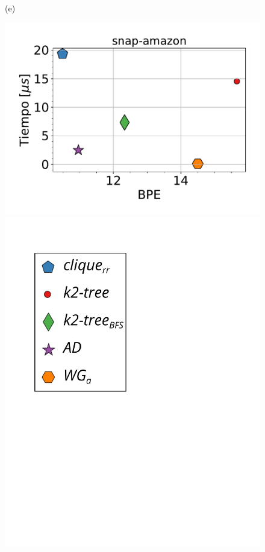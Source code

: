 \begin{figure}
\begin{minipage}{1\textwidth}
\begin{minipage}{0.45\textwidth}
    			(e)
    		\end{minipage}
    		\begin{minipage}{0.45\textwidth}
    			\centering
    			\begin{minipage}{0.75\textwidth}
    				\centering
    				\includegraphics[width=1\linewidth]{img/bpeTimes/aleatorio/snap-amazon.pdf}
    			\end{minipage}
    			\begin{minipage}{0.2\textwidth}
    				\centering
    				\includegraphics[scale=.2, clip, trim=60 194 0 0]{img/bpeTimes/labelAle.pdf}
    			\end{minipage}
    			

\end{minipage}
\end{minipage}
\end{figure}
